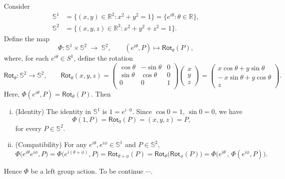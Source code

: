 \documentclass[11pt,openany]{article}
\begin{document}
Consider \begin{align*}
	\mathbb{S}^1&=\{(x,y)\in\mathbb{R}^2 : x^2+y^2=1\}=\{e^{i\theta}: \theta\in\mathbb{R}\},\\
	\mathbb{S}^2&=\{(x,y,z)\in\mathbb{R}^3 : x^2+y^2+z^2=1\}.
\end{align*}
Define the map  
\[
\Phi\colon \mathbb{S}^1\times \mathbb{S}^2 \;\longrightarrow\; \mathbb{S}^2,\qquad (e^{i\theta},P)\mapsto\mathsf{Rot}_\theta(P),
\] where, for each  \(e^{i\theta}\in S^1\), define the rotation  
\[
\mathsf{Rot}_\theta\colon \mathbb{S}^2\to \mathbb{S}^2,\qquad
\mathsf{Rot}_\theta(x,y,z)=
\begin{pmatrix}
	\cos\theta & -\sin\theta & 0 \\
	\sin\theta & \cos\theta & 0 \\
	0 & 0 & 1 \\
\end{pmatrix}
\begin{pmatrix}
	x \\ y\\ z
\end{pmatrix}
=\begin{pmatrix}
	x\cos\theta + y\sin\theta\\ -\,x\sin\theta + y\cos\theta\\ z
\end{pmatrix}.
\] Here, \(\Phi(e^{i\theta},P)=\mathsf{Rot}_\theta(P)\). Then \begin{enumerate}[(i)]
	\item (Identity) The identity in \(\mathbb{S}^1\) is \(1=e^{i\cdot0}\).  Since  
	\(\cos0=1\), \(\sin0=0\), we have \[
	\Phi(1,P)=\mathsf{Rot}_{0}(P)=(x,y,z)=P,
	\] for every \(P\in \mathbb{S}^2\).  
	\item (Compatibility) For any \(e^{i\theta},e^{i\phi}\in \mathbb{S}^1\) and \(P\in \mathbb{S}^2\),  
	\[
	\Phi\bigl(e^{i\theta}e^{i\phi},P\bigr)
	= \Phi\bigl(e^{i(\theta+\phi)},P\bigr)
	= \mathsf{Rot}_{\theta+\phi}(P)
	= \mathsf{Rot}_\theta\!\bigl(\mathsf{Rot}_\phi(P)\bigr)
	= \Phi\bigl(e^{i\theta}\,,\,\Phi(e^{i\phi},P)\bigr).
	\]
\end{enumerate}
Hence \(\Phi\) be a left group action. To be continue $\cdots$.

%
\end{document}
